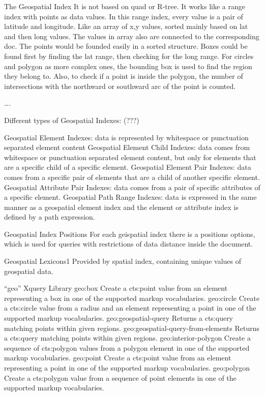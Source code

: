 \documentclass[a4paper,12pt]{article}
\begin{document}
The Geospatial Index
It is not based on quad or R-tree. It works like a range index with points as data values. In this range index, every value is a pair of latitude and longitude. Like an array of x,y values, sorted mainly based on lat and then long values. The values in array also are connected to the corresponding doc.
The points would be founded easily in a sorted structure. Boxes could be found first by finding the lat range, then checking for the long range. For circles and polygon as more complex ones, the bounding box is used to find the region they belong to. Also, to check if a point is inside the polygon, the number of intersections with the northward or southward arc of the point is counted. 

…. 

Different types of Geospatial Indexes: (???)

 Geospatial Element Indexes: data is represented by whitespace or punctuation separated element content 
 Geospatial Element Child Indexes: data comes from whitespace or punctuation separated element content, but only for elements that are a specific child of a specific element.
 Geospatial Element Pair Indexes: data comes from a specific pair of elements that are a child of another specific element.
 Geospatial Attribute Pair Indexes: data comes from a pair of specific attributes of a specific element.
 Geospatial Path Range Indexes: data is expressed in the same manner as a geospatial element index and the element or attribute index is defined by a path expression.


Geospatial Index Positions
	For each geispatial index there is a positions options, which is used for queries with restrictions of data distance inside the document.

Geospatial Lexicons1
Provided by spatial index, containing unique values of  geospatial data. 

“geo” Xquery Library
geo:box
Create a cts:point value from an element representing a box in one of the supported markup vocabularies.
geo:circle
Create a cts:circle value from a radius and an element representing a point in one of the supported markup vocabularies.
geo:geospatial-query
Returns a cts:query matching points within given regions.
geo:geospatial-query-from-elements
Returns a cts:query matching points within given regions.
geo:interior-polygon
Create a sequence of cts:polygon values from a polygon element in one of the supported markup vocabularies.
geo:point
Create a cts:point value from an element representing a point in one of the supported markup vocabularies.
geo:polygon
Create a cts:polygon value from a sequence of point elements in one of the supported markup vocabularies.
\end{document}
